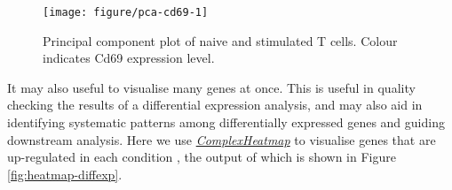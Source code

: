 \documentclass[9pt,a4paper,]{extarticle}
\begin{document}
\begin{figure}

{\centering \texttt{[image: figure/pca-cd69-1]} 

}

\caption{Principal component plot of naive and stimulated T cells. Colour indicates Cd69 expression level.}\label{fig:pca-cd69}
\end{figure}

It may also useful to visualise many genes at once. This is useful in quality
checking the results of a differential expression analysis, and may also
aid in identifying systematic patterns among differentially expressed genes
and guiding downstream analysis. Here we use \emph{\href{https://bioconductor.org/packages/3.11/ComplexHeatmap}{ComplexHeatmap}}
to visualise genes that are up-regulated in each condition \citep{Gu2016},
the output of which is shown in Figure \ref{fig:heatmap-diffexp}.
\end{document}
